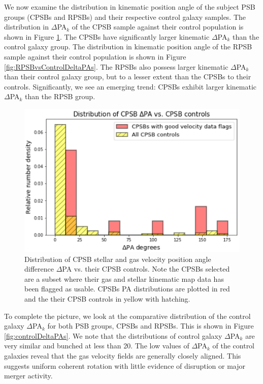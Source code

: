 We now examine the distribution in kinematic position angle of the subject PSB groups (CPSBs and RPSBs) and their respective control galaxy samples. The distribution in $\Delta$PA$_{k}$ of the CPSB sample against their control population is shown in Figure \ref{fig:CPSBvsControlDeltaPAs}. The CPSBs have significantly larger kinematic $\Delta$PA$_{k}$ than the control galaxy group. The distribution in kinematic position angle of the RPSB sample against their control population is shown in Figure \ref{fig:RPSBvsControlDeltaPAs}. The RPSBs also possess larger kinematic $\Delta$PA$_{k}$ than their control galaxy group, but to a lesser extent than the CPSBs to their controls. Significantly, we see an emerging trend: CPSBs exhibit larger kinematic $\Delta$PA$_{k}$ than the RPSB group.

\begin{figure}
    \centering
    \includegraphics[width=\columnwidth]{images/JupyterPlots/DIST-DPA-CPSB+FLAGS+controls.png}
    \caption[Distribution of CPSB $\Delta$PA vs. their CPSB controls]{Distribution of CPSB stellar and gas velocity position angle difference $\Delta$PA vs. their CPSB controls. Note the CPSBs selected are a subset where their gas and stellar kinematic map data has been flagged as usable. CPSBs PA distributions are plotted in red and the their CPSB controls in yellow with hatching.}
    \label{fig:CPSBvsControlDeltaPAs}
\end{figure}

To complete the picture, we look at the comparative distribution of the control galaxy $\Delta$PA$_{k}$ for both PSB groups, CPSBs and RPSBs. This is shown in Figure \ref{fig:controlDeltaPAs}. We note that the distributions of control galaxy $\Delta$PA$_{k}$ are very similar and bunched at less than 20\textdegree. The low values of $\Delta$PA$_{k}$ of the control galaxies reveal that the gas velocity fields  are generally closely aligned. This suggests uniform coherent rotation with little evidence of disruption or major merger activity.

